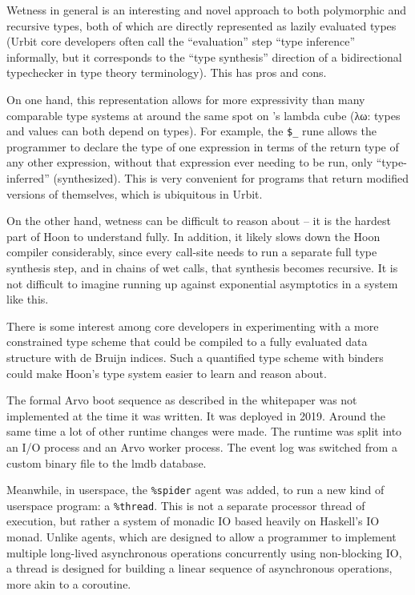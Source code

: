 \documentclass[twoside]{article}
\begin{document}
Wetness in general is an interesting and novel approach to both polymorphic and recursive types, both of which are directly represented as lazily evaluated types (Urbit core developers often call the ``evaluation'' step ``type inference'' informally, but it corresponds to the ``type synthesis'' direction of a bidirectional typechecker in type theory terminology).  This has pros and cons.

On one hand, this representation allows for more expressivity than many comparable type systems at around the same spot on \citeauthor{Barendregt1991}'s lambda cube (λω: types and values can both depend on types).  For example, the \lstinline[style=inlinecode]{$_} rune allows the programmer to declare the type of one expression in terms of the return type of any other expression, without that expression ever needing to be run, only ``type-inferred'' (synthesized).  This is very convenient for programs that return modified versions of themselves, which is ubiquitous in Urbit.

On the other hand, wetness can be difficult to reason about – it is the hardest part of Hoon to understand fully.  In addition, it likely slows down the Hoon compiler considerably, since every call-site needs to run a separate full type synthesis step, and in chains of wet calls, that synthesis becomes recursive.  It is not difficult to imagine running up against exponential asymptotics in a system like this.

There is some interest among core developers in experimenting with a more constrained type scheme that could be compiled to a fully evaluated data structure with de Bruijn indices.  Such a quantified type scheme with binders could make Hoon's type system easier to learn and reason about.

The formal Arvo boot sequence as described in the whitepaper was not implemented at the time it was written.  It was deployed in 2019.  Around the same time a lot of other runtime changes were made.  The runtime was split into an I/O process and an Arvo worker process.  The event log was switched from a custom binary file to the {\sc lmdb} database.

Meanwhile, in userspace, the \lstinline[style=inlinecode]{%spider} agent was added, to run a new kind of userspace program: a \lstinline[style=inlinecode]{%thread}.  This is not a separate processor thread of execution, but rather a system of monadic IO based heavily on Haskell's IO monad.  Unlike agents, which are designed to allow a programmer to implement multiple long-lived asynchronous operations concurrently using non-blocking IO, a thread is designed for building a linear sequence of asynchronous operations, more akin to a coroutine.
\end{document}

